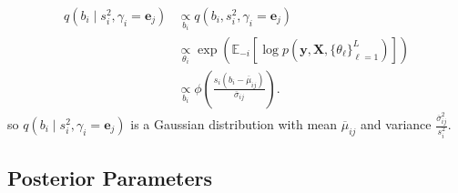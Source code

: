 \documentclass{article}
\newcommand{\E}{\mathbb{E}}
\begin{document}
\begin{align*}
    q(b_i \;|\; s_i^2, \gamma_i = \mathbf{e}_j) &\underset{b_i}{\propto} q(b_i, s_i^2, \gamma_i = \mathbf{e}_j) \\
    &\underset{\theta_i}{\propto} \exp\left(\E_{-i}\left[\log p\left(\mathbf{y}, \mathbf{X}, \{\theta_\ell\}_{\ell=1}^L\right)\right]\right) \\
    &\underset{b_i}{\propto}  \phi\left( \frac{s_i(b_i - \overline{\mu}_{ij})}{\overline{\sigma}_{ij}}\right). 
\end{align*}
so $ q(b_i \;|\; s_i^2, \gamma_i = \mathbf{e}_j)$ is a Gaussian distribution with mean $\overline{\mu}_{ij}$ and variance $\frac{\overline{\sigma}^2_{ij}}{s_i^2}$.

\subsection{Posterior Parameters}
\end{document}
